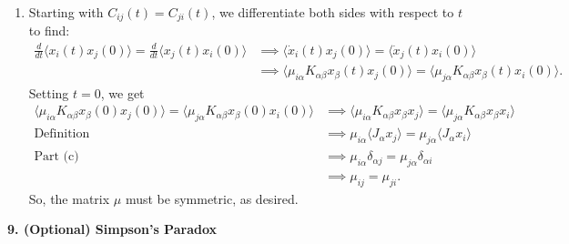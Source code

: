 \documentclass{article}
\theoremstyle{definition}
\newcommand{\al}{\alpha}
\newcommand{\be}{\beta}
\newcommand{\f}[2]{\frac{#1}{#2}}
\begin{document}
\begin{enumerate}[label=(\alph*)]
	
	\item Starting with $C_{ij}(t) = C_{ji}(t)$, we differentiate both sides with respect to $t$ to find:
	\begin{align*}
	\f{d}{dt}\langle x_i(t)x_j(0)\rangle = \f{d}{dt}\langle x_j(t)x_i(0)\rangle 
	&\implies \langle \dot x_i(t)x_j(0)\rangle = \langle \dot x_j(t)x_i(0)\rangle \\
	&\implies \langle \mu_{i\al}K_{\al\be}x_\be(t)x_j(0) \rangle = \langle \mu_{j\al}K_{\al\be}x_\be(t)x_i(0) \rangle.
	\end{align*}
	Setting $t=0$, we get
	\begin{align*}
	\langle \mu_{i\al}K_{\al\be}x_\be(0)x_j(0) \rangle = \langle \mu_{j\al}K_{\al\be}x_\be(0)x_i(0) \rangle 
	&\implies \langle \mu_{i\al}K_{\al\be}x_\be x_j \rangle = \langle \mu_{j\al}K_{\al\be}x_\be x_i \rangle \\
	\text{Definition} \quad &\implies \mu_{i\al } \langle J_\al x_j \rangle = \mu_{j \al} \langle J_\al x_i\rangle \\
	\text{Part (c)}\quad  &\implies \mu_{i\al}\delta_{\al j} = \mu_{j\al} \delta_{\al i}\\
	&\implies \mu_{ij} = \mu_{ji}.
	\end{align*}
	So, the matrix $\mu$ must be symmetric, as desired. 
\end{enumerate}

\noindent \textbf{9. (Optional) Simpson's Paradox}
\end{document}
